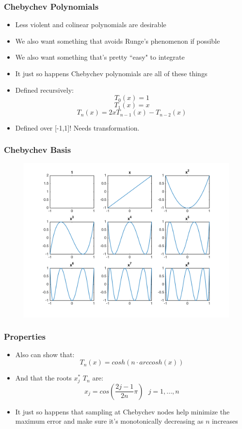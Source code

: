 \documentclass{beamer}
\begin{document}
\begin{frame}
\frametitle[alignment=center]{Chebychev Polynomials}
\begin{itemize}
\item Less violent and colinear polynomials are desirable
\item We also want something that avoids Runge's phenomenon if possible
\item We also want something that's pretty ``easy" to integrate 
\item It just so happens Chebychev polynomials are all of these things
\item Defined recursively:
$$T_0(x)=1$$
$$T_1(x)=x$$
$$T_{n}(x)=2xT_{n-1}(x)-T_{n-2}(x)$$
\item Defined over [-1,1]!  Needs transformation.
\end{itemize}
\end{frame}

\begin{frame}
\frametitle[alignment=center]{Chebychev Basis}
\begin{figure}
\centering
\includegraphics[scale=0.5]{Bases_Chebychev.png}
\end{figure}
\end{frame}

\begin{frame}
\frametitle[alignment=center]{Properties}
\begin{itemize}
\item Also can show that:
$$T_n(x)=cosh(n\cdot arccosh(x))$$
\item And that the roots $x_j^*$ $T_n$ are:
$$x_j=cos\left(\frac{2j-1}{2n}\pi\right)\ \ \ j=1,...,n$$
\item It just so happens that sampling at Chebychev nodes help minimize the maximum error and make sure it's monotonically decreasing as $n$ increases
\end{itemize}
\end{frame}
\end{document}
